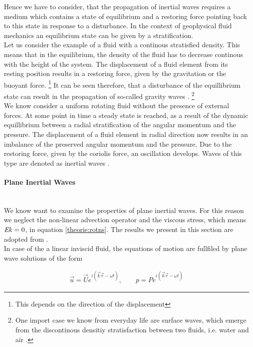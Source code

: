 Hence we have to consider, that the propagation of inertial waves requires a medium which contains a state of equilibrium and
a restoring force pointing back to this state in response to a disturbance.
In the context of geophysical fluid mechanics an equilibrium state can be given by a stratification.\\
Let us consider the example of a fluid with a continous stratisfied density.
This means that in the equilibrium, the density of the fluid has to decrease
continous with the height of the system. The displacement of a fluid element
 from its resting position results in a restoring force, given by the
gravitation or the buoyant force.
\footnote{This depends on the direction of the displacement}
It can be seen therefore, that a disturbance of the equillibrium state can result in the
propagation of so-called  gravity waves \cite{Clausen2011}.
\footnote{One import case we know from everyday life are surface waves, which emerge
from the discontinous densitiy stratisfaction between two fluids, i.e. water and air \cite{Clausen2011}.}\\
We know consider a uniform rotating fluid without the presence of external forces.
At some point in time a steady state is reached, as a result of the dynamic equillibrium between
a radial stratification of the angular momentum and the pressure.
The displacement of a fluid element in radial direction now results in
an imbalance of the preserved angular momentum and the pressure.
Due to the restoring force, given by the coriolis force, an oscillation develops.
Waves of this type are denoted as inertial waves \cite{Clausen2011}.

\paragraph{Plane Inertial Waves}\mbox{}\\

We know want to examine the properties of plane inertial waves.
For this reason we neglect the non-linear advection operator and the viscous stress,
which means $\mbox{\textit{Ek}}=0$, in equation \ref{theorie:rotns}. The results we present in this section
are adopted from \citep[p.185]{Greenspan1990}.\\
In case of the a linear inviscid fluid, the equations of motion are fullfiled by plane wave solutions of the form

\begin{align}
    \vec{u} = \vec{U} e^{i(\vec{k}\vec{r}  - \omega t )}, \qquad
    p = P e^{i(\vec{k}\vec{r}  - \omega t )}
\end{align}


